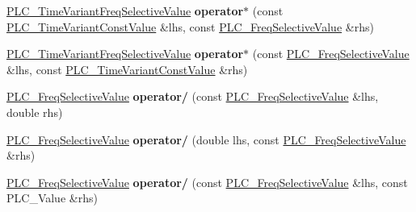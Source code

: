 \begin{DoxyCompactItemize}
\item 
\hypertarget{classns3_1_1PLC__FreqSelectiveValue_a98a7967618d0d619603a8af279eb8919}{\hyperlink{classns3_1_1PLC__TimeVariantFreqSelectiveValue}{\-P\-L\-C\-\_\-\-Time\-Variant\-Freq\-Selective\-Value} {\bfseries operator$\ast$} (const \hyperlink{classns3_1_1PLC__TimeVariantConstValue}{\-P\-L\-C\-\_\-\-Time\-Variant\-Const\-Value} \&lhs, const \hyperlink{classns3_1_1PLC__FreqSelectiveValue}{\-P\-L\-C\-\_\-\-Freq\-Selective\-Value} \&rhs)}\label{classns3_1_1PLC__FreqSelectiveValue_a98a7967618d0d619603a8af279eb8919}

\item 
\hypertarget{classns3_1_1PLC__FreqSelectiveValue_a94310ec03556c2390343a5e2239ca9cf}{\hyperlink{classns3_1_1PLC__TimeVariantFreqSelectiveValue}{\-P\-L\-C\-\_\-\-Time\-Variant\-Freq\-Selective\-Value} {\bfseries operator$\ast$} (const \hyperlink{classns3_1_1PLC__FreqSelectiveValue}{\-P\-L\-C\-\_\-\-Freq\-Selective\-Value} \&lhs, const \hyperlink{classns3_1_1PLC__TimeVariantConstValue}{\-P\-L\-C\-\_\-\-Time\-Variant\-Const\-Value} \&rhs)}\label{classns3_1_1PLC__FreqSelectiveValue_a94310ec03556c2390343a5e2239ca9cf}

\item 
\hypertarget{classns3_1_1PLC__FreqSelectiveValue_a0152530fd94b46f4d1abce2ef005f41c}{\hyperlink{classns3_1_1PLC__FreqSelectiveValue}{\-P\-L\-C\-\_\-\-Freq\-Selective\-Value} {\bfseries operator/} (const \hyperlink{classns3_1_1PLC__FreqSelectiveValue}{\-P\-L\-C\-\_\-\-Freq\-Selective\-Value} \&lhs, double rhs)}\label{classns3_1_1PLC__FreqSelectiveValue_a0152530fd94b46f4d1abce2ef005f41c}

\item 
\hypertarget{classns3_1_1PLC__FreqSelectiveValue_a1901dc8118e8a4bfb5520d8222cf8789}{\hyperlink{classns3_1_1PLC__FreqSelectiveValue}{\-P\-L\-C\-\_\-\-Freq\-Selective\-Value} {\bfseries operator/} (double lhs, const \hyperlink{classns3_1_1PLC__FreqSelectiveValue}{\-P\-L\-C\-\_\-\-Freq\-Selective\-Value} \&rhs)}\label{classns3_1_1PLC__FreqSelectiveValue_a1901dc8118e8a4bfb5520d8222cf8789}

\item 
\hypertarget{classns3_1_1PLC__FreqSelectiveValue_acae99c64e3b54c49a0c37091045cbbe2}{\hyperlink{classns3_1_1PLC__FreqSelectiveValue}{\-P\-L\-C\-\_\-\-Freq\-Selective\-Value} {\bfseries operator/} (const \hyperlink{classns3_1_1PLC__FreqSelectiveValue}{\-P\-L\-C\-\_\-\-Freq\-Selective\-Value} \&lhs, const \-P\-L\-C\-\_\-\-Value \&rhs)}\label{classns3_1_1PLC__FreqSelectiveValue_acae99c64e3b54c49a0c37091045cbbe2}


\end{DoxyCompactItemize}

